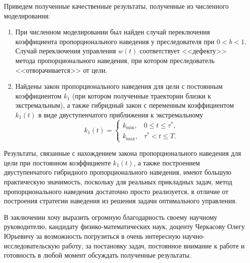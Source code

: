 \documentclass[a4paper,12pt, openany]{book}
\theoremstyle{plain} %
\theoremstyle{definition} %
\theoremstyle{remark} %
\numberwithin{equation}{chapter}
\begin{document}
{Приведем полученные качественные результаты, полученные из численного моделирования:

\begin{enumerate}
\item При численном моделировании был найден случай переключения коэффициента пропорционального наведения у преследователя при $0<b<1$. Случай переключения управления $w(t)$ соответствует <<дефекту>> метода пропорционального наведения, при котором преследователь <<отворачивается>> от цели. 
\item Найдены закон пропорционального наведения для цели с постоянным коэффициентом $k_1$ (при котором полученные траектории близки к экстремальным), а также гибридный закон с переменным коэффициентом $k_1(t)$ в виде двуступенчатого приближения к экстремальному
$$k_1 \left( t \right) = 
\begin{cases}
   k_{\min } , & 0 \leqslant t \leqslant \tau^* ,  \\
   k_{\max } ,& \tau^*  < t \leqslant T. 
\end{cases}
$$ 
\end{enumerate}

Результаты, связанные с нахождением закона пропорционального наведения для цели при постоянном коэффициенте $k_1(t)$, а также построением двуступенчатого гибридного пропорционального наведения, имеют большую практическую значимость, поскольку для реальных прикладных задач, метод пропорционального наведения достаточно просто реализуется, в отличие от построения стратегии наведения из решения задачи оптимального управления.  

В заключении хочу выразить огромную благодарность своему научному руководителю, кандидату физико-математических наук, доценту Черкасову Олегу Юрьевичу за возможность погрузиться в очень интересную научно-исследовательскую работу, за постановку задач, постоянное внимание к работе и готовность в любой момент обсуждать полученные результаты.  







\newpage


}
\end{document}
